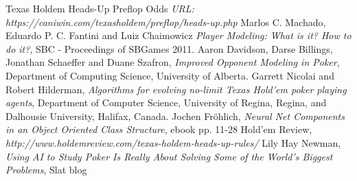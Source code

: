 \begin{thebibliography}{100} 
 Texas Holdem Heads-Up Preflop Odds 
\emph{URL: https://caniwin.com/texasholdem/preflop/heads-up.php}
 Marlos C. Machado, Eduardo P. C. Fantini and Luiz Chaimowicz \emph{Player Modeling: What is it? How to do it?}, SBC - Proceedings of SBGames 2011.
 Aaron Davidson, Darse Billings, Jonathan Schaeffer and Duane Szafron, \emph{Improved Opponent Modeling in Poker},
Department of Computing Science, University of Alberta.
 Garrett Nicolai and Robert Hilderman, \emph{Algorithms for evolving no-limit Texas Hold'em poker playing agents}, Department of Computer Science, University of Regina, Regina, and Dalhousie University, Halifax, Canada.
 Jochen Fröhlich, \emph {Neural Net Components in an Object Oriented Class Structure}, 
ebook pp. 11-28
 Hold'em Review, \emph {http://www.holdemreview.com/texas-holdem-heads-up-rules/}
 Lily Hay Newman, \emph{Using AI to Study Poker Is Really About Solving Some of the World’s Biggest Problems}, 
Slat blog
\bibitem {}
\end{thebibliography}